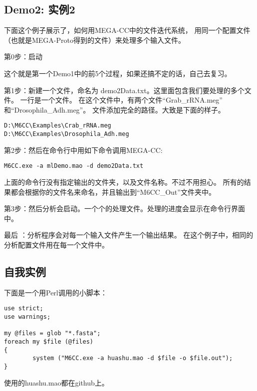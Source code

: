 \documentclass{ctexart}
\begin{document}
\subsection{Demo2: 实例2}
\label{sec-3-7}

下面这个例子展示了，如何用MEGA-CC中的文件迭代系统，
用同一个配置文件（也就是MEGA-Proto得到的文件）来处理多个输入文件。

第0步：启动

这个就是第一个Demo1中的前5个过程，如果还搞不定的话，自己去复习。

第1步：新建一个文件，命名为 demo2Data.txt。这里面包含我们要处理的多个文件。
        一行是一个文件。
        在这个文件中，有两个文件“Grab\_rRNA.meg” 和“Drosophila\_Adh.meg”。
        文件添加完全的路径。大致是下面的样子。

\begin{lstlisting}
D:\M6CC\Examples\Crab_rRNA.meg 
D:\M6CC\Examples\Drosophila_Adh.meg
\end{lstlisting}
第2步：然后在命令行中用如下命令调用MEGA-CC:

\begin{lstlisting}
M6CC.exe -a mlDemo.mao -d demo2Data.txt
\end{lstlisting}
        
      
       上面的命令行没有指定输出的文件夹，以及文件名称。不过不用担心。
       所有的结果都会根据你的文件名来命名，并且输出到“M6CC\_Out”文件夹中。

第3步：然后分析会启动。一个个的处理文件。处理的进度会显示在命令行界面中。

最后 ：分析程序会对每一个输入文件产生一个输出结果。
        在这个例子中，相同的分析配置文件用在每一个文件中。
\subsection{自我实例}
\label{sec-3-8}

下面是一个用Perl调用的小脚本：

\begin{lstlisting}
use strict;
use warnings;

my @files = glob "*.fasta";
foreach my $file (@files)
{
        system ("M6CC.exe -a huashu.mao -d $file -o $file.out");
}
\end{lstlisting}
使用的huashu.mao都在github上。
\end{document}
